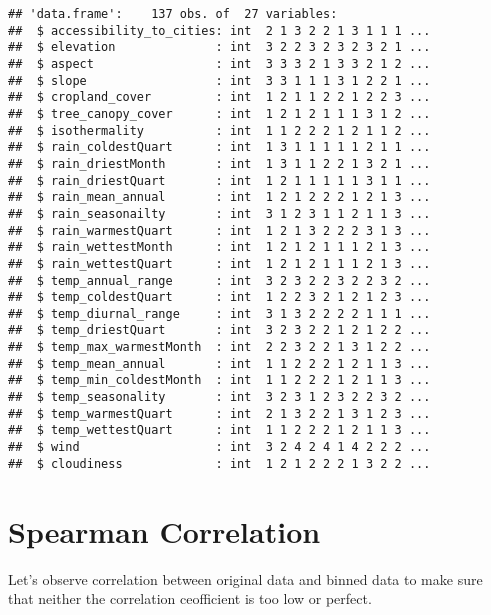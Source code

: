 \documentclass[]{book}
\begin{document}
\begin{verbatim}
## 'data.frame':    137 obs. of  27 variables:
##  $ accessibility_to_cities: int  2 1 3 2 2 1 3 1 1 1 ...
##  $ elevation              : int  3 2 2 3 2 3 2 3 2 1 ...
##  $ aspect                 : int  3 3 3 2 1 3 3 2 1 2 ...
##  $ slope                  : int  3 3 1 1 1 3 1 2 2 1 ...
##  $ cropland_cover         : int  1 2 1 1 2 2 1 2 2 3 ...
##  $ tree_canopy_cover      : int  1 2 1 2 1 1 1 3 1 2 ...
##  $ isothermality          : int  1 1 2 2 2 1 2 1 1 2 ...
##  $ rain_coldestQuart      : int  1 3 1 1 1 1 1 2 1 1 ...
##  $ rain_driestMonth       : int  1 3 1 1 2 2 1 3 2 1 ...
##  $ rain_driestQuart       : int  1 2 1 1 1 1 1 3 1 1 ...
##  $ rain_mean_annual       : int  1 2 1 2 2 2 1 2 1 3 ...
##  $ rain_seasonailty       : int  3 1 2 3 1 1 2 1 1 3 ...
##  $ rain_warmestQuart      : int  1 2 1 3 2 2 2 3 1 3 ...
##  $ rain_wettestMonth      : int  1 2 1 2 1 1 1 2 1 3 ...
##  $ rain_wettestQuart      : int  1 2 1 2 1 1 1 2 1 3 ...
##  $ temp_annual_range      : int  3 2 3 2 2 3 2 2 3 2 ...
##  $ temp_coldestQuart      : int  1 2 2 3 2 1 2 1 2 3 ...
##  $ temp_diurnal_range     : int  3 1 3 2 2 2 2 1 1 1 ...
##  $ temp_driestQuart       : int  3 2 3 2 2 1 2 1 2 2 ...
##  $ temp_max_warmestMonth  : int  2 2 3 2 2 1 3 1 2 2 ...
##  $ temp_mean_annual       : int  1 1 2 2 2 1 2 1 1 3 ...
##  $ temp_min_coldestMonth  : int  1 1 2 2 2 1 2 1 1 3 ...
##  $ temp_seasonality       : int  3 2 3 1 2 3 2 2 3 2 ...
##  $ temp_warmestQuart      : int  2 1 3 2 2 1 3 1 2 3 ...
##  $ temp_wettestQuart      : int  1 1 2 2 2 1 2 1 1 3 ...
##  $ wind                   : int  3 2 4 2 4 1 4 2 2 2 ...
##  $ cloudiness             : int  1 2 1 2 2 2 1 3 2 2 ...
\end{verbatim}

\hypertarget{spearman-correlation-1}{%
\section{Spearman Correlation}\label{spearman-correlation-1}}

Let's observe correlation between original data and binned data to make
sure that neither the correlation ceofficient is too low or perfect.
\end{document}
